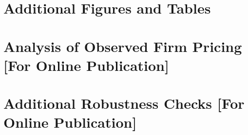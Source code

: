 \renewcommand\thefigure{\thesection.\arabic{figure}}
\renewcommand\thetable{\thesection.\arabic{table}}

\section{Additional Figures and Tables\label{sec:app_add_fig_tab}}

\clearpage

\section{Analysis of Observed Firm Pricing \small [For Online Publication] \label{sec:app_firm_pricing}}

\newpage

\section{Additional Robustness Checks \small [For Online Publication]\label{sec:app_robust}}

\newpage
